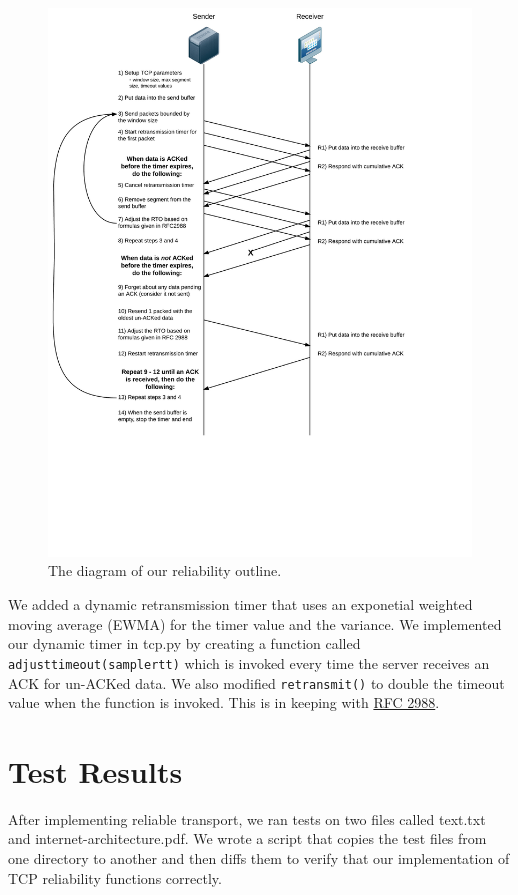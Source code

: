 \documentclass[11pt]{article}
\begin{document}
\begin{figure}[H]
\caption{The diagram of our reliability outline.}
\label{diagram1}
  \centering
  \includegraphics{diagram1}
\end{figure}

We added a dynamic retransmission timer that uses an exponetial weighted moving average (EWMA) for the timer value and the variance. We implemented our dynamic timer in tcp.py by creating a function called \texttt{adjust\textunderscore timeout(sample\textunderscore rtt)} which is invoked every time the server receives an ACK for un-ACKed data. We also modified \texttt{retransmit()} to double the timeout value when the function is invoked. This is in keeping with \href{http://www.ietf.org/rfc/rfc2988.txt}{RFC 2988}.

\section{Test Results}

After implementing reliable transport, we ran tests on two files called text.txt and internet-architecture.pdf. We wrote a script that copies the test files from one directory to another and then diffs them to verify that our implementation of TCP reliability functions correctly. 
\end{document}
